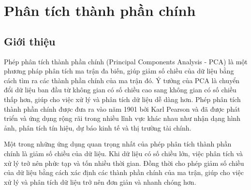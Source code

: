 \documentclass[12pt,a4paper,oneside]{report}
\numberwithin{equation}{section}
\begin{document}
\chapter{ Phân tích thành phần chính }
\section{Giới thiệu}
Phép phân tích thành phần chính (Principal Components Analysis - PCA) là một phương pháp phân tích ma trận đa biến, giúp giảm số chiều của dữ liệu bằng cách tìm ra các thành phần chính của ma trận đó. Ý tưởng của PCA là chuyển đổi dữ liệu ban đầu từ không gian có số chiều cao sang không gian có số chiều thấp hơn, giúp cho việc xử lý và phân tích dữ liệu dễ dàng hơn.
Phép phân tích thành phần chính được đưa ra vào năm 1901 bởi Karl Pearson và đã được phát triển và ứng dụng rộng rãi trong nhiều lĩnh vực khác nhau như nhận dạng hình ảnh, phân tích tín hiệu, dự báo kinh tế và thị trường tài chính.

Một trong những ứng dụng quan trọng nhất của phép phân tích thành phần chính là giảm số chiều của dữ liệu. Khi dữ liệu có số chiều lớn, việc phân tích và xử lý trở nên phức tạp và tốn nhiều thời gian. Đồng thời cho phép giảm số chiều của dữ liệu bằng cách xác định các thành phần chính của ma trận, giúp cho việc xử lý và phân tích dữ liệu trở nên đơn giản và nhanh chóng hơn.
\end{document}
